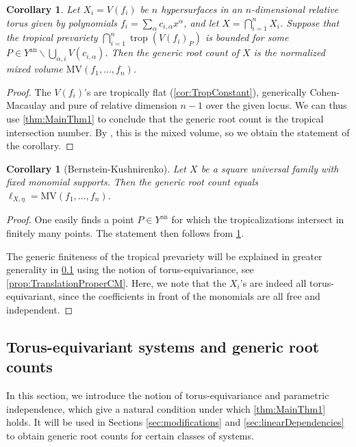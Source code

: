\documentclass[12pt,reqno,a4paper]{amsart}
\theoremstyle{theoremstyle}
\newtheorem{corollary}[theorem]{Corollary}
\theoremstyle{examplestyle}
\theoremstyle{algorithmstyle}
\DeclareMathOperator{\trop}{trop}
\begin{document}
\begin{corollary}\label{thm:SquareBounded}
Let $X_{i}=V(f_{i})$ be $n$ hypersurfaces in an $n$-dimensional relative torus given by polynomials $f_{i}=\sum_\alpha c_{i,\alpha}x^{\alpha}$, and let $X=\bigcap_{i=1}^{n} X_i$.
%
Suppose that the tropical prevariety $\bigcap_{i=1}^{n}\trop(V(f_{i})_P)$ is bounded for some $P\in{Y^{\mathrm{an}}\backslash\bigcup_{\alpha,i}{V(c_{i,\alpha})}}$.
Then the generic root count of $X$ is the normalized mixed volume $\mathrm{MV}(f_{1},\dots,f_{n})$.
\end{corollary}
\begin{proof}
  The $V(f_{i})$'s are tropically flat (\cref{cor:TropConstant}), %
  generically Cohen-Macaulay and %
  pure of relative dimension $n-1$ over the given locus. %
  We can thus use \cref{thm:MainThm1} to conclude that the generic root count is the tropical intersection number. By \cite[Theorem 4.6.8]{MS15}, %
  this is the mixed volume, so we obtain the statement of the corollary.
\end{proof}

\begin{corollary}[Bernstein-Kushnirenko]\label{cor:BKK}
Let $X$ be a square universal family with fixed monomial supports. Then the generic root count equals $\ell_{X,\eta}=\mathrm{MV}(f_{1},\dots,f_{n})$.
\end{corollary}
\begin{proof}
  One easily finds a point $P\in{Y^{\mathrm{an}}}$ for which the tropicalizations intersect in finitely many points.   The statement then follows from \cref{thm:SquareBounded}.

  The generic finiteness of the tropical prevariety will be explained in greater generality in \cref{sec:TorusEquivariant} using the notion of torus-equivariance, see \cref{prop:TranslationProperCM}. Here, we note that the $X_{i}$'s are indeed all torus-equivariant, since the coefficients in front of the monomials are all free and independent.
\end{proof}



\subsection{Torus-equivariant systems and generic root counts}\label{sec:TorusEquivariant}
In this section, we introduce the notion of torus-equivariance and parametric independence, which give a natural condition under which \cref{thm:MainThm1} holds. It will be used in Sections \ref{sec:modifications} and \ref{sec:linearDependencies} to obtain generic root counts for certain classes of systems.
\end{document}
